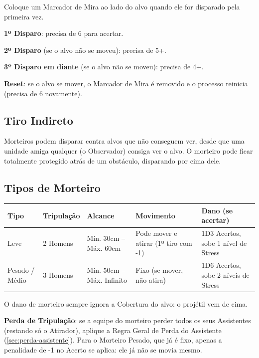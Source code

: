 Coloque um Marcador de Mira ao lado do alvo quando ele for disparado pela primeira vez.

\textbf{1º Disparo}: precisa de 6 para acertar.

\textbf{2º Disparo} (se o alvo não se moveu): precisa de 5+.

\textbf{3º Disparo em diante} (se o alvo não se moveu): precisa de 4+.

\textbf{Reset}: se o alvo se mover, o Marcador de Mira é removido e o processo reinicia (precisa de 6 novamente).

\subsection{Tiro Indireto}

Morteiros podem disparar contra alvos que não conseguem ver, desde que uma unidade amiga qualquer (o Observador) consiga ver o alvo. O morteiro pode ficar totalmente protegido atrás de um obstáculo, disparando por cima dele.

\subsection{Tipos de Morteiro}

\begin{center}
\begin{tabular}{p{2.2cm}p{1.8cm}p{2.8cm}p{3.2cm}p{3.2cm}}
\toprule
Tipo & Tripulação & Alcance & Movimento & Dano (se acertar) \\
\midrule
Leve & 2 Homens & Mín. 30cm -- Máx. 60cm & Pode mover e atirar (1º tiro com -1) & 1D3 Acertos, sobe 1 nível de Stress \\
Pesado / Médio & 3 Homens & Mín. 50cm -- Máx. Infinito & Fixo (se mover, não atira) & 1D6 Acertos, sobe 2 níveis de Stress \\
\bottomrule
\end{tabular}
\end{center}

\begin{nota}
O dano de morteiro sempre ignora a Cobertura do alvo: o projétil vem de cima.
\end{nota}

\begin{nota}
\textbf{Perda de Tripulação}: se a equipe do morteiro perder todos os seus Assistentes (restando só o Atirador), aplique a Regra Geral de Perda do Assistente (\ref{sec:perda-assistente}). Para o Morteiro Pesado, que já é fixo, apenas a penalidade de -1 no Acerto se aplica: ele já não se movia mesmo.
\end{nota}

